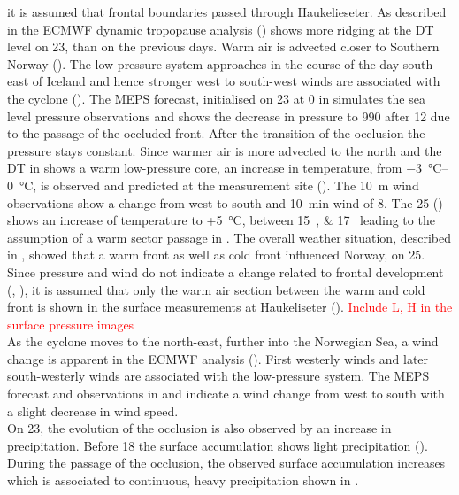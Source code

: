 it is assumed that frontal boundaries passed through Haukelieseter. 
As described in  the ECMWF dynamic tropopause analysis () shows more ridging at the DT level on \SI{23}{\dec}, than on the previous days. Warm air is advected closer to Southern Norway (). The low-pressure system approaches in the course of the day south-east of Iceland and hence stronger west to south-west winds are associated with the cyclone (). The MEPS forecast, initialised on \SI{23}{\dec} at \SI{0}{\UTC} in  simulates the sea level pressure observations and shows the decrease in pressure to \SI{990}{\hPa} after \SI{12}{\UTC} due to the passage of the occluded front. After the transition of the occlusion the pressure stays constant. Since warmer air is more advected to the north and the DT in  shows a warm low-pressure core, an increase in temperature, from \SIrange{-3}{0}{\celsius}, is observed and predicted at the measurement site (). The \SI{10}{\metre} wind observations show a change from west to south and \SI{10}{\minute} wind of \SI{8}{\mPs}.
The \SI{25}{\dec} () shows an increase of temperature to +\SI{5}{\celsius}, between \SIlist{15;17}{\UTC} leading to the assumption of a warm sector passage in . The overall weather situation, described in , showed that a warm front as well as cold front influenced Norway, on \SI{25}{\dec}. Since pressure and wind do not indicate a change related to frontal development (, ), it is assumed that only the warm air section between the warm and cold front is shown in the surface measurements at Haukeliseter ().  
\textcolor{red}{Include L, H in the surface pressure images}
\\
As the cyclone moves to the north-east, further into the Norwegian Sea, a wind change is apparent in the ECMWF analysis (). First westerly winds and later south-westerly winds are associated with the low-pressure system. The MEPS forecast and observations in  and  indicate a wind change from west to south with a slight decrease in wind speed.
\\
On \SI{23}{\dec}, the evolution of the occlusion is also observed by an increase in precipitation. Before \SI{18}{\UTC} the surface accumulation shows light precipitation (). During the passage of the occlusion, the observed surface accumulation increases which is associated to continuous, heavy precipitation shown in .
